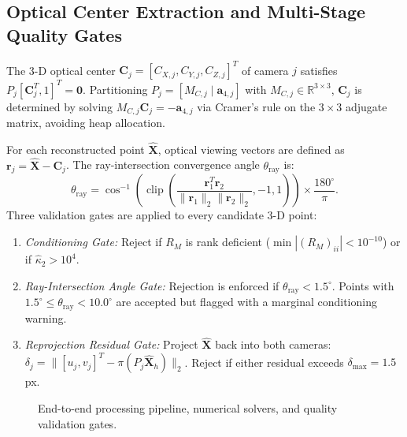 \documentclass[a4paper,conference]{IEEEtran}
\newcommand{\R}{\mathbb{R}}
\newcommand{\X}{\mathbf{X}}
\newcommand{\kappaTwo}{\widehat{\kappa}_2}
\begin{document}
\subsection{Optical Center Extraction and Multi-Stage Quality Gates}
The 3-D optical center $\mathbf{C}_j = [C_{X,j}, C_{Y,j}, C_{Z,j}]^T$ of camera $j$ satisfies $P_j [\mathbf{C}_j^T, 1]^T = \mathbf{0}$. Partitioning $P_j = [M_{C,j} \mid \mathbf{a}_{4,j}]$ with $M_{C,j} \in \R^{3 \times 3}$, $\mathbf{C}_j$ is determined by solving $M_{C,j} \mathbf{C}_j = -\mathbf{a}_{4,j}$ via Cramer's rule on the $3 \times 3$ adjugate matrix, avoiding heap allocation.

For each reconstructed point $\hat{\X}$, optical viewing vectors are defined as $\mathbf{r}_j = \hat{\X} - \mathbf{C}_j$. The ray-intersection convergence angle $\theta_{\mathrm{ray}}$ is:
\begin{equation}
\theta_{\mathrm{ray}} = \cos^{-1}\left(\operatorname{clip}\left(\frac{\mathbf{r}_1^T \mathbf{r}_2}{\|\mathbf{r}_1\|_2 \|\mathbf{r}_2\|_2}, -1, 1\right)\right) \times \frac{180^\circ}{\pi}.
\label{eq:ray}
\end{equation}
Three validation gates are applied to every candidate 3-D point:
\begin{enumerate}
  \item \textit{Conditioning Gate:} Reject if $R_M$ is rank deficient ($\min |(R_M)_{ii}| < 10^{-10}$) or if $\kappaTwo > 10^4$.
  \item \textit{Ray-Intersection Angle Gate:} Rejection is enforced if $\theta_{\mathrm{ray}} < 1.5^\circ$. Points with $1.5^\circ \le \theta_{\mathrm{ray}} < 10.0^\circ$ are accepted but flagged with a marginal conditioning warning.
  \item \textit{Reprojection Residual Gate:} Project $\hat{\X}$ back into both cameras: $\delta_j = \|[u_j, v_j]^T - \pi(P_j \hat{\X}_h)\|_2$. Reject if either residual exceeds $\delta_{\max} = 1.5$ px.
\end{enumerate}

\begin{figure}[t]
\centering
{}
\caption{End-to-end processing pipeline, numerical solvers, and quality validation gates.}
\label{fig:pipeline}
\end{figure}
\end{document}
